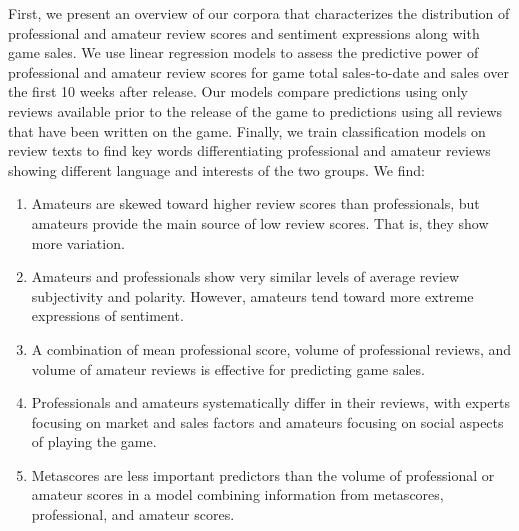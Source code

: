 \documentclass[letterpaper]{article}
\begin{document}
First, we present an overview of our corpora that characterizes the distribution of professional and amateur review scores and sentiment expressions along with game sales. We use linear regression models to assess the predictive power of professional and amateur review scores for game total sales-to-date and sales over the first 10 weeks after release. Our models compare predictions using only reviews available prior to the release of the game to predictions using all reviews that have been written on the game. Finally, we train classification models on review texts to find key words differentiating professional and amateur reviews showing different language and interests of the two groups. We find:
\begin{enumerate}
\item Amateurs are skewed toward higher review scores than professionals, but amateurs provide the main source of low review scores. That is, they show more variation.
\item Amateurs and professionals show very similar levels of average review subjectivity and polarity. However, amateurs tend toward more extreme expressions of sentiment.
\item A combination of mean professional score, volume of professional reviews, and volume of amateur reviews is effective for predicting game sales.
\item Professionals and amateurs systematically differ in their reviews, with experts focusing on market and sales factors and amateurs focusing on social aspects of playing the game.
\item Metascores are less important predictors than the volume of professional or amateur scores in a model combining information from metascores, professional, and amateur scores.
\end{enumerate}
\end{document}
